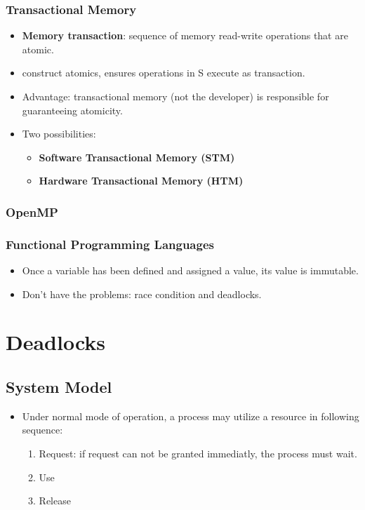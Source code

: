 \documentclass[10pt]{report}
\begin{document}
		\subsection{Transactional Memory}
			\begin{itemize}
				\item \textbf{Memory transaction}: sequence of memory read-write operations that are atomic.
				\item construct atomic{s}, ensures operations in S execute as transaction.
				\item Advantage: transactional memory (not the developer) is responsible for guaranteeing atomicity.
				\item Two possibilities:
				\begin{itemize}
					\item \textbf{Software Transactional Memory (STM)}
					\item \textbf{Hardware Transactional Memory (HTM)}
				\end{itemize}
			\end{itemize}

		\subsection{OpenMP}

		\subsection{Functional Programming Languages}
			\begin{itemize}
				\item Once a variable has been defined and assigned a value, its value is immutable.
				\item Don't have the problems: race condition and deadlocks.
			\end{itemize}


\chapter{Deadlocks} \label{ch:Chapter7}
	\section{System Model}
		\begin{itemize}
			\item Under normal mode of operation, a process may utilize a resource in following sequence:
			\begin{enumerate}
				\item Request: if request can not be granted immediatly, the process must wait.
				\item Use
				\item Release
			\end{enumerate}
		\end{itemize}
\end{document}
